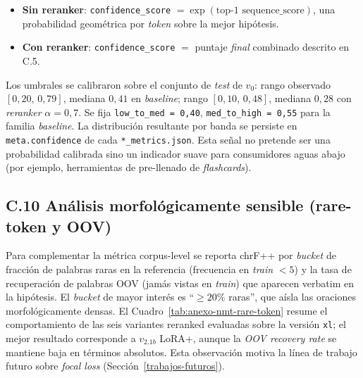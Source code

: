 \documentclass[12pt,a4paper,oneside]{book}
\begin{document}
\begin{itemize}
  \item \textbf{Sin reranker}: \texttt{confidence\_score} \(= \exp(\text{top-1 sequence\_score})\), una probabilidad geométrica por \emph{token} sobre la mejor hipótesis.
  \item \textbf{Con reranker}: \texttt{confidence\_score} \(=\) puntaje \emph{final} combinado descrito en C.5.
\end{itemize}

Los umbrales se calibraron sobre el conjunto de \emph{test} de \(v_0\): rango observado \([0{,}20,\, 0{,}79]\), mediana \(0{,}41\) en \emph{baseline}; rango \([0{,}10,\, 0{,}48]\), mediana \(0{,}28\) con \emph{reranker} \(\alpha=0{,}7\). Se fija \texttt{low\_to\_med = 0{,}40}, \texttt{med\_to\_high = 0{,}55} para la familia \emph{baseline}. La distribución resultante por banda se persiste en \texttt{meta.confidence} de cada \texttt{*\_metrics.json}. Esta señal no pretende ser una probabilidad calibrada sino un indicador suave para consumidores aguas abajo (por ejemplo, herramientas de pre-llenado de \emph{flashcards}).

\subsection*{C.10 Análisis morfológicamente sensible (rare-token y OOV)}\label{anexo-nmt-rare-token}

Para complementar la métrica corpus-level se reporta chrF++ por \emph{bucket} de fracción de palabras raras en la referencia (frecuencia en \emph{train} \(<5\)) y la tasa de recuperación de palabras OOV (jamás vistas en \emph{train}) que aparecen verbatim en la hipótesis. El \emph{bucket} de mayor interés es ``\(\geq 20\%\) raras'', que aísla las oraciones morfológicamente densas. El Cuadro~\ref{tab:anexo-nmt-rare-token} resume el comportamiento de las seis variantes reranked evaluadas sobre la versión \texttt{xl}; el mejor resultado corresponde a \(v_{2.1b}\) LoRA+, aunque la \emph{OOV recovery rate} se mantiene baja en términos absolutos. Esta observación motiva la línea de trabajo futuro sobre \emph{focal loss} (Sección~\ref{trabajos-futuros}).

\begin{table}[h]
\centering
\caption{Análisis rare-token / OOV sobre el bucket de referencias con \(\geq 20\%\) palabras raras para las variantes reranked (variante \texttt{xl}).}
\label{tab:anexo-nmt-rare-token}
\resizebox{\linewidth}{!}{}
\end{table}
\end{document}
